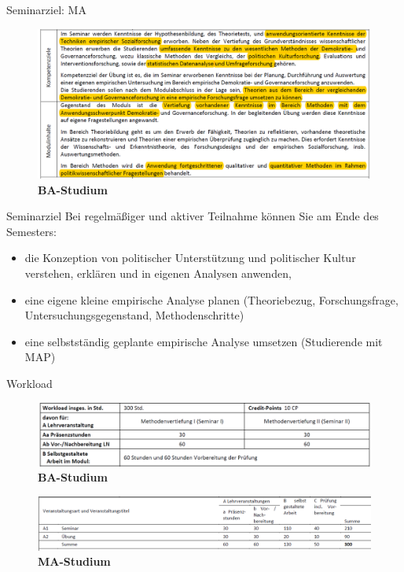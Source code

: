 \documentclass[11pt]{beamer}
\begin{document}
\begin{frame}[t]{Seminarziel: MA}
	\begin{figure}[ht]
		\includegraphics[width=\textwidth]{pics/pre3.png}
		\caption{\textbf{BA-Studium}}
	\end{figure}
\end{frame}

\begin{frame}[t]{Seminarziel}
Bei regelmäßiger und aktiver Teilnahme können Sie am Ende des Semesters: \\
	
	\begin{itemize}
		\item die Konzeption von politischer Unterstützung und politischer Kultur verstehen, erklären und in eigenen Analysen anwenden,\pause
		\item eine eigene kleine empirische Analyse planen (Theoriebezug, Forschungsfrage, Untersuchungsgegenstand, Methodenschritte)\pause
		\item eine selbstständig geplante empirische Analyse umsetzen (Studierende mit MAP)\pause
	\end{itemize}

\end{frame}

\begin{frame}[t]{Workload}
	\begin{figure}[ht]
		\includegraphics[width=\textwidth]{pics/pre4.png}
		\caption{\textbf{BA-Studium}}
	\end{figure}

	\begin{figure}[ht]
		\includegraphics[width=\textwidth]{pics/pre5.png}
		\caption{\textbf{MA-Studium}}
	\end{figure}
\end{frame}
\end{document}
